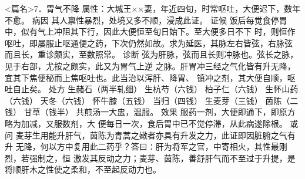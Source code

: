 \documentclass[a4paper,12pt,UTF8,twoside]{ctexbook}
\begin{document}
<篇名>7．胃气不降
属性：大城王××妻，年近四旬，时常呕吐，大便迟下，数年不愈。 
病因 其人禀性暴烈，处境又多不顺，浸成此证。 
证候 饭后每觉食停胃中，似有气上冲阻其下行，因此大便恒至旬日始下。至大便多日不下 
时，则恒作呕吐，即屡服止呕通便之药，下次仍然如故。求为延医，其脉左右皆弦，右脉弦 
而且长，重诊颇实，至数照常。 
诊断 弦为肝脉，弦而且长则冲脉也。弦长之脉，见于右部，尤按之颇实，此又为胃气上逆 
之脉。肝胃冲三经之气化皆有升无降，宜其下焦便秘而上焦呕吐也。此当治以泻肝、降胃、 
镇冲之剂，其大便自顺，呕吐自止矣。 
处方 生赭石（两半轧细） 生杭芍（六钱） 柏子仁（六钱） 生怀山药（六钱） 
天冬（六钱） 怀牛膝（五钱） 当归（四钱） 生麦芽（三钱） 
茵陈（二钱） 甘草（钱半） 
共煎汤一大盅，温服。 
效果 服药一剂，大便即通下，即原方略为加减，又服数剂，大 
便每日一次，食后胃中已不觉停滞，从此病遂除根。 
或问 麦芽生用能升肝气，茵陈为青蒿之嫩者亦具有升发之力，此证即因脏腑之气有升 
无降，何以方中复用此二药乎？答曰∶肝为将军之官，中寄相火，其性最刚烈，若强制之，恒 
激发其反动之力；麦芽、茵陈，善舒肝气而不至过于升提，是将顺肝木之性使之柔和，不至起反动力也。 
\end{document}
